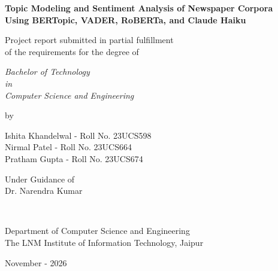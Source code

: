 \thispagestyle{empty}
\begin{center}
{\Large \bf Topic Modeling and Sentiment Analysis of Newspaper Corpora\\
Using BERTopic, VADER, RoBERTa, and Claude Haiku  }


\vspace*{1.75cm}
{\large Project report submitted in partial fulfillment\\}
{\large  of the requirements for the degree of \\}

\vspace*{1cm}
{\it {\large Bachelor of Technology} \\
{\large in\\}
{\large Computer Science and Engineering \\}}

\vspace*{1cm}
{\large by}

\vspace*{1cm}
{\large Ishita Khandelwal - Roll No.  23UCS598\\}
{\large Nirmal Patel - Roll No.  23UCS664 \\}
{\large Pratham Gupta - Roll No.  23UCS674 \\}


\vspace*{5mm}
{\large Under Guidance of \\}
{\large Dr. Narendra Kumar \\}

\vspace*{1.0cm}
{\\}

\vspace*{2.0cm}
{\large Department of Computer Science and Engineering \\}
{\large The LNM Institute of Information Technology, Jaipur\\}

\vspace*{1.0cm}
{\large November - 2026\\}
\end{center}

\clearpage
